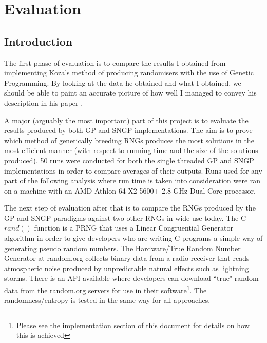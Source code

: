 \documentclass[a4paper,10.5pt]{article}
\begin{document}
\newpage
\section{Evaluation}

\subsection{Introduction}
The first phase of evaluation is to compare the results I obtained from implementing Koza's method of producing randomisers with the use of Genetic Programming. By looking at the data he obtained and what I obtained, we should be able to paint an accurate picture of how well I managed to convey his description in his paper \cite{kozarng}.

A major (arguably the most important) part of this project is to evaluate the results produced by both GP and SNGP implementations. The aim is to prove which method of genetically breeding RNGs produces the most solutions in the most efficient manner (with respect to running time and the size of the solutions produced). 50 runs were conducted for both the single threaded GP and SNGP implementations in order to compare averages of their outputs. Runs used for any part of the following analysis where run time is taken into consideration were ran on a machine with an AMD Athlon 64 X2 5600+ 2.8 GHz Dual-Core processor.

The next step of evaluation after that is to compare the RNGs produced by the GP and SNGP paradigms against two other RNGs in wide use today. The C $rand()$ function is a PRNG that uses a Linear Congruential Generator algorithm in order to give developers who are writing C programs a simple way of generating pseudo random numbers. The Hardware/True Random Number Generator at random.org collects binary data from a radio receiver that reads atmospheric noise produced by unpredictable natural effects such as lightning storms. There is an API available where developers can download ``true" random data from the random.org servers for use in their software\footnote{Please see the implementation section of this document for details on how this is achieved}. The randomness/entropy is tested in the same way for all approaches.
\end{document}
